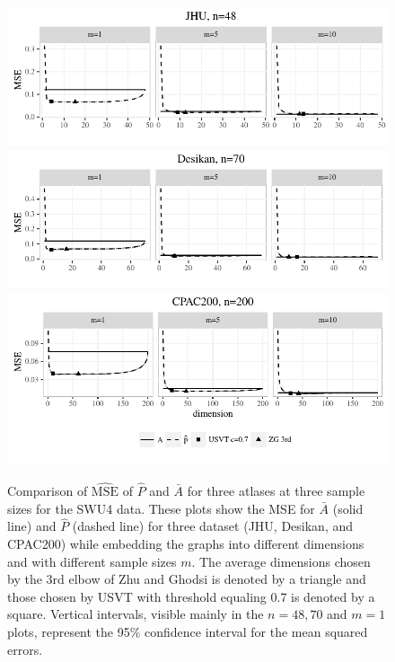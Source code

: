 \begin{figure}
\centering
\includegraphics[width=.99\textwidth]{./Figures/corr_data_MSE_jhu.pdf}\\
\includegraphics[width=.99\textwidth]{./Figures/corr_data_MSE_desikan.pdf}\\
\includegraphics[width=.99\textwidth]{./Figures/corr_data_MSE_CPAC200.pdf}
\caption[Comparison of MSE of two estimators for three atlases at three sample sizes for the SWU4 data]{Comparison of $\hat{\mathrm{MSE}}$ of $\hat{P}$ and $\bar{A}$ for three atlases at three sample sizes for the SWU4 data.
These plots show the MSE for $\bar{A}$ (solid line) and $\hat{P}$ (dashed line) for three dataset (JHU, Desikan, and CPAC200) while embedding the graphs into different dimensions and with different sample sizes $m$. The average dimensions chosen by the 3rd elbow of Zhu and Ghodsi is denoted by a triangle
 and those chosen by USVT with threshold equaling 0.7 is denoted by a square.
Vertical intervals, visible mainly in the $n=48,70$ and $m=1$ plots, represent the 95\% confidence interval for the mean squared errors. }
\label{fig:LLG_realdata_MSE}
\end{figure}


